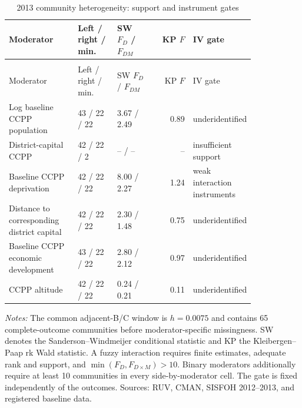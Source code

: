 \begingroup\fontsize{9.25}{11.4}\selectfont
\setlength{\tabcolsep}{3pt}\renewcommand{\arraystretch}{1.18}
\begin{longtable}{@{}>{\raggedright\arraybackslash}p{0.28\linewidth}p{0.16\linewidth}p{0.15\linewidth}rp{0.24\linewidth}@{}}
\caption{2013 community heterogeneity: support and instrument gates}\label{tab:pub_A03} \\
\toprule Moderator & Left / right / min. & SW \(F_D\) / \(F_{D M}\) & KP \(F\) & IV gate \\ \midrule\endfirsthead
\multicolumn{5}{c}{\tablename\ \thetable{} -- continued} \\
\toprule Moderator & Left / right / min. & SW \(F_D\) / \(F_{D M}\) & KP \(F\) & IV gate \\ \midrule\endhead
Log baseline CCPP population & 43 / 22 / 22 & 3.67 / 2.49 & 0.89 & underidentified \\
District-capital CCPP & 42 / 22 / 2 & -- / -- & -- & insufficient support \\
Baseline CCPP deprivation & 42 / 22 / 22 & 8.00 / 2.27 & 1.24 & weak interaction instruments \\
Distance to corresponding district capital & 42 / 22 / 22 & 2.30 / 1.48 & 0.75 & underidentified \\
Baseline CCPP economic development & 43 / 22 / 22 & 2.80 / 2.12 & 0.97 & underidentified \\
CCPP altitude & 42 / 22 / 22 & 0.24 / 0.21 & 0.11 & underidentified \\
\bottomrule\end{longtable}
\parbox{0.97\linewidth}{\footnotesize \textit{Notes:} The common adjacent-B/C window is \(h=0.0075\) and contains 65 complete-outcome communities before moderator-specific missingness. SW denotes the Sanderson--Windmeijer conditional statistic and KP the Kleibergen--Paap rk Wald statistic. A fuzzy interaction requires finite estimates, adequate rank and support, and \(\min(F_D,F_{D\times M})>10\). Binary moderators additionally require at least 10 communities in every side-by-moderator cell. The gate is fixed independently of the outcomes. Sources: RUV, CMAN, SISFOH 2012--2013, and registered baseline data.}
\par{}\par\endgroup
